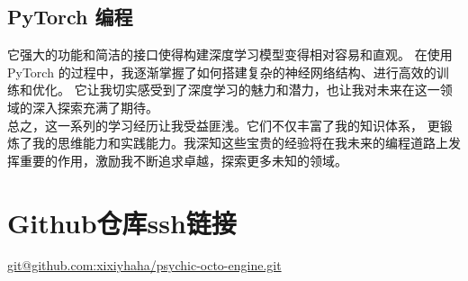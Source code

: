 \documentclass{ctexart}
\begin{document}
\subsection{PyTorch 编程}它强大的功能和简洁的接口使得构建深度学习模型变得相对容易和直观。
在使用 PyTorch 的过程中，我逐渐掌握了如何搭建复杂的神经网络结构、进行高效的训练和优化。
它让我切实感受到了深度学习的魅力和潜力，也让我对未来在这一领域的深入探索充满了期待。\\


总之，这一系列的学习经历让我受益匪浅。它们不仅丰富了我的知识体系，
更锻炼了我的思维能力和实践能力。我深知这些宝贵的经验将在我未来的编程道路上发挥重要的作用，激励我不断追求卓越，探索更多未知的领域。
\section{Github仓库ssh链接}
 \url {git@github.com:xixiyhaha/psychic-octo-engine.git }
\end{document}
